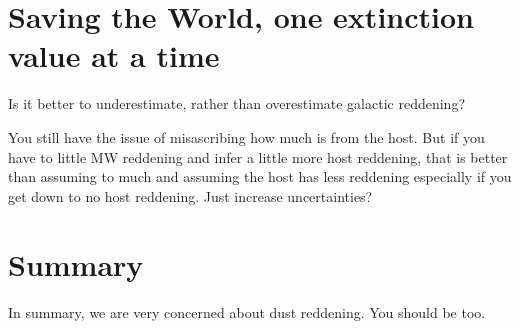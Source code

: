 \documentclass[twocolumn]{aastex61}
\begin{document}
\section{Saving the World, one extinction value at a time  \label{sec_templates}}

Is it better to underestimate, rather than overestimate galactic reddening?

You still have the issue of misascribing how much is from the host.  But if you have to little MW reddening and infer a little more host reddening, that is better than assuming to much and assuming the host has less reddening especially if you get down to no host reddening.  Just increase uncertainties?



\section{Summary\label{sec_summary}}

In summary, we are very concerned about dust reddening.  You should be too.

\acknowledgments




\vspace{5mm}




{}
\end{document}
